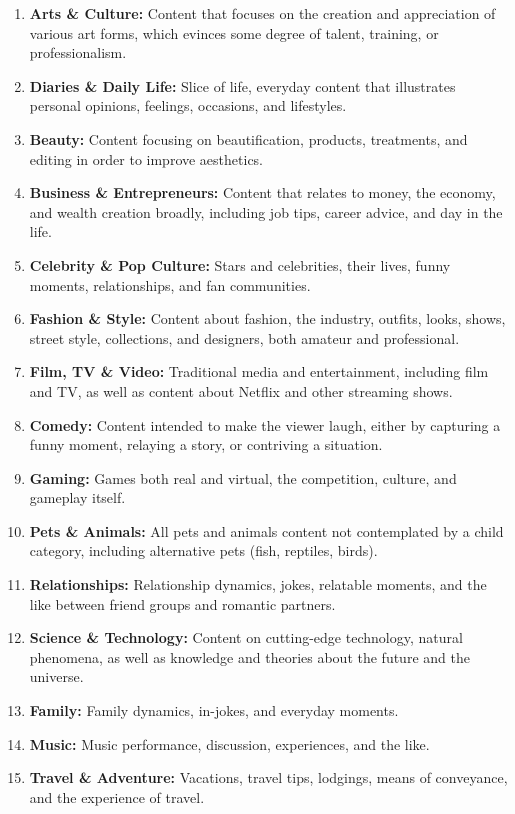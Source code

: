 \begin{enumerate}
    \item \textbf{Arts \& Culture:} Content that focuses on the creation and appreciation of various art forms, which evinces some degree of talent, training, or professionalism.
    \item \textbf{Diaries \& Daily Life:} Slice of life, everyday content that illustrates personal opinions, feelings, occasions, and lifestyles.
    \item \textbf{Beauty:} Content focusing on beautification, products, treatments, and editing in order to improve aesthetics.
    \item \textbf{Business \& Entrepreneurs:} Content that relates to money, the economy, and wealth creation broadly, including job tips, career advice, and day in the life.
    \item \textbf{Celebrity \& Pop Culture:} Stars and celebrities, their lives, funny moments, relationships, and fan communities.
    \item \textbf{Fashion \& Style:} Content about fashion, the industry, outfits, looks, shows, street style, collections, and designers, both amateur and professional.
    \item \textbf{Film, TV \& Video:} Traditional media and entertainment, including film and TV, as well as content about Netflix and other streaming shows.
    \item \textbf{Comedy:} Content intended to make the viewer laugh, either by capturing a funny moment, relaying a story, or contriving a situation.
    \item \textbf{Gaming:} Games both real and virtual, the competition, culture, and gameplay itself.
    \item \textbf{Pets \& Animals:} All pets and animals content not contemplated by a child category, including alternative pets (fish, reptiles, birds).
    \item \textbf{Relationships:} Relationship dynamics, jokes, relatable moments, and the like between friend groups and romantic partners.
    \item \textbf{Science \& Technology:} Content on cutting-edge technology, natural phenomena, as well as knowledge and theories about the future and the universe.
    \item \textbf{Family:} Family dynamics, in-jokes, and everyday moments.
    \item \textbf{Music:} Music performance, discussion, experiences, and the like.
    \item \textbf{Travel \& Adventure:} Vacations, travel tips, lodgings, means of conveyance, and the experience of travel.

\end{enumerate}
